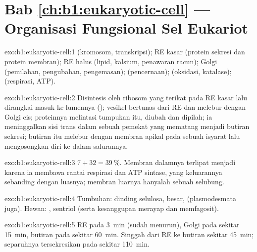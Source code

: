 \section*{Bab \ref{ch:b1:eukaryotic-cell} --- Organisasi Fungsional Sel Eukariot}

\begin{solution}{exo:b1:eukaryotic-cell:1}
 (kromosom, transkripsi); RE kasar (protein sekresi dan protein
membran); RE halus (lipid, kalsium, penawaran racun); Golgi (pemilahan,
pengubahan, pengemasan);  (pencernaan);  (oksidasi,
katalase);  (respirasi, ATP).
\end{solution}

\begin{solution}{exo:b1:eukaryotic-cell:2}
Disintesis oleh ribosom yang terikat pada RE kasar lalu dirangkai masuk
ke lumennya (); vesikel bertunas dari RE dan melebur
dengan Golgi cis; proteinnya melintasi tumpukan itu, diubah dan
dipilah; ia meninggalkan sisi trans dalam sebuah  pemekat yang
mematang menjadi butiran sekresi; butiran itu melebur dengan membran
apikal pada sebuah isyarat lalu mengosongkan diri ke dalam salurannya.
\end{solution}

\begin{solution}{exo:b1:eukaryotic-cell:3}
$7 + 32 = \qty{39}{\%}$. Membran dalamnya terlipat menjadi 
karena ia membawa rantai respirasi dan ATP sintase, yang keluarannya
sebanding dengan luasnya; membran luarnya hanyalah sebuah selubung.
\end{solution}

\begin{solution}{exo:b1:eukaryotic-cell:4}
Tumbuhan: dinding selulosa,  besar,  (plasmodesmata
juga). Hewan: , sentriol (serta kesanggupan merayap dan
memfagosit).
\end{solution}

\begin{solution}{exo:b1:eukaryotic-cell:5}
RE pada \qty{3}{min} (sudah menurun), Golgi pada sekitar \qty{15}{min},
butiran pada sekitar \qty{60}{min}. Singgah dari RE ke butiran sekitar
\qty{45}{min}; separuhnya tersekresikan pada sekitar \qty{110}{min}.
\end{solution}

